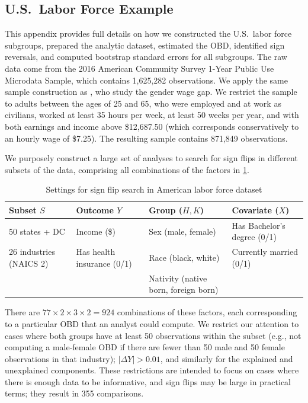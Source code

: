 \subsection{U.S.\ Labor Force Example}
\label{appendix:us_labor_force}
This appendix provides full details on how we constructed the U.S.\ labor force subgroups, prepared the analytic dataset, estimated the OBD, identified sign reversals, and computed bootstrap standard errors for all subgroups. 
The raw data come from the 2016 American Community Survey 1-Year Public Use Microdata Sample, which contains 1,625,282 observations.
We apply the same sample construction as \citet{bach2024heterogeneity}, who study the gender wage gap.
We restrict the sample to adults between the ages of 25 and 65, who were employed and at work as civilians, worked at least 35 hours per week, at least 50 weeks per year, and with both earnings and income above \$12,687.50 (which corresponds conservatively to an hourly wage of \$7.25).
The resulting sample contains 871,849 observations.

We purposely construct a large set of analyses to search for sign flips in different subsets of the data, comprising all combinations of the factors in \cref{tab:us_census_design}.

\begin{table}[h]
    \centering
    \small
    \caption{Settings for sign flip search in American labor force dataset}
    \label{tab:us_census_design}
    \begin{tabular}{l l l l}
    \toprule
    Subset \( S \)          & Outcome \( Y \)            & Group (\( H, K \))                     & Covariate (\(X\))        \\ 
    \midrule
    50 states + DC          & Income           (\$)      & Sex  (male, female)                 & Has Bachelor's degree (0/1) \\
    26 industries (NAICS 2) & Has health insurance (0/1) & Race (black, white)                  & Currently married (0/1)     \\
                            &                            & Nativity (native born, foreign born) & \\
    \bottomrule                         
\end{tabular}
\end{table}

There are \( 77 \times 2 \times 3 \times 2 = 924\) combinations of these factors, each corresponding to a particular OBD that an analyst could compute.
We restrict our attention to cases where both groups have at least 50 observations within the subset (e.g., not computing a male-female OBD if there are fewer than 50 male and 50 female observations in that industry); \( | \Delta Y | > 0.01 \), and similarly for the explained and unexplained components.
These restrictions are intended to focus on cases where there is enough data to be informative,  and sign flips may be large in practical terms; they result in 355 comparisons.

